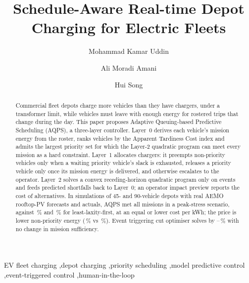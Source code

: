\documentclass[preprint,12pt]{elsarticle}
\begin{document}
\begin{frontmatter}

\title{Schedule-Aware Real-time Depot Charging for Electric Fleets}

\author[inst1]{Mohammad Kamar Uddin}
\author[inst1]{Ali Moradi Amani}
\author[inst2]{Hui Song}


\begin{abstract}
Commercial fleet depots charge more vehicles than they have chargers, under a transformer limit, while
vehicles must leave with enough energy for rostered trips that change during the day. This paper proposes
Adaptive Queuing-based Predictive Scheduling (AQPS), a three-layer controller. Layer~0 derives each
vehicle's mission energy from the roster, ranks vehicles by the Apparent Tardiness Cost index and admits
the largest priority set for which the Layer-2 quadratic program can meet every mission as a hard
constraint. Layer~1 allocates chargers: it preempts non-priority vehicles only when a waiting priority
vehicle's slack is exhausted, releases a priority vehicle only once its mission energy is delivered, and
otherwise escalates to the operator. Layer~2 solves a convex receding-horizon quadratic program only on
events and feeds predicted shortfalls back to Layer~0; an operator impact preview reports the cost of
alternatives. In simulations of 45- and 90-vehicle depots with real AEMO rooftop-PV forecasts and actuals,
AQPS met all missions in a peak-stress scenario, against \RMissionLLFSThreeFortyFive\,\% and
\RMissionLLFSThreeNinety\,\% for least-laxity-first, at an equal or lower cost per kWh; the price is lower
non-priority energy (\RNonPriRTETSThreeFortyFive\,\% vs \RNonPriLLFSThreeFortyFive\,\%). Event triggering
cut optimiser solves by \RTotRedMin--\RTotRedMax\,\% with no change in mission sufficiency.
\end{abstract}

\begin{keyword}
EV fleet charging \sep depot charging \sep priority scheduling \sep model predictive control
\sep event-triggered control \sep human-in-the-loop
\end{keyword}

\end{frontmatter}
\end{document}
